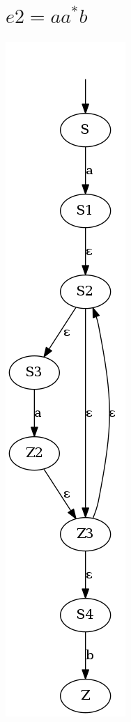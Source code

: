 \documentclass{article}
\begin{document}
\section{$e2 = a a^{*} b $}
\includegraphics[scale=0.5]{e2.png}
    
\end{document}
